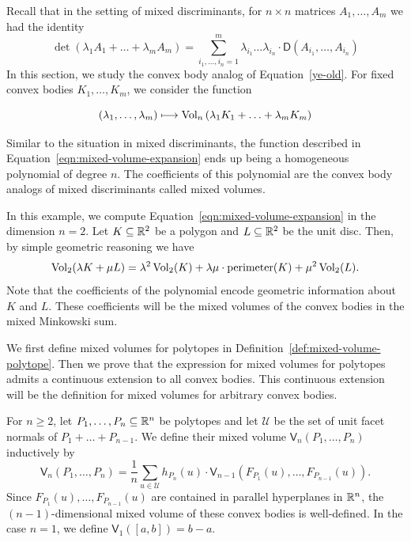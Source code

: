 \documentclass{puthesis-UG}
\begin{document}
Recall that in the setting of mixed discriminants, for $n \times n$ matrices $A_1, \ldots, A_m$ we had the identity
\begin{equation} \label{ye-old}
	\det (\lambda_1 A_1 + \ldots + \lambda_m A_m) = \sum_{i_1, \ldots, i_n = 1}^m \lambda_{i_1} \ldots \lambda_{i_n} \cdot \mathsf{D}(A_{i_1}, \ldots, A_{i_n})
\end{equation}
In this section, we study the convex body analog of Equation~\ref{ye-old}. For fixed convex bodies $K_1, \ldots, K_m$, we consider the function

\begin{equation} \label{eqn:mixed-volume-expansion}
	(\lambda_1, \ldots, \lambda_m) \longmapsto \operatorname{Vol}_n \left (\lambda_1 K_1 + \ldots + \lambda_m K_m \right )
\end{equation}

Similar to the situation in mixed discriminants, the function described in Equation~\ref{eqn:mixed-volume-expansion} ends up being a homogeneous polynomial of degree $n$. The coefficients of this polynomial are the convex body analogs of mixed discriminants called mixed volumes. 

\begin{example} \label{example:small-case}
	In this example, we compute Equation~\ref{eqn:mixed-volume-expansion} in the dimension $n = 2$. Let $K \subseteq \mathbb{R}^2$ be a polygon and $L \subseteq \mathbb{R}^2$ be the unit disc. Then, by simple geometric reasoning we have 
	\[
		\operatorname{Vol}_2 (\lambda K + \mu L) = \lambda^2 \operatorname{Vol}_2(K) + \lambda \mu \cdot \text{perimeter}(K) + \mu^2 \operatorname{Vol}_2(L). 
	\]
	Note that the coefficients of the polynomial encode geometric information about $K$ and $L$. These coefficients will be the mixed volumes of the convex bodies in the mixed Minkowski sum. 
\end{example}

We first define mixed volumes for polytopes in Definition~\ref{def:mixed-volume-polytope}. Then we prove that the expression for mixed volumes for polytopes admits a continuous extension to all convex bodies. This continuous extension will be the definition for mixed volumes for arbitrary convex bodies.

\begin{defn} \label{def:mixed-volume-polytope}
	For $n \geq 2$, let $P_1, \ldots, P_n \subseteq \mathbb{R}^n$ be polytopes and let $\mathcal{U}$ be the set of unit facet normals of $P_1 + \ldots + P_{n-1}$. We define their mixed volume $\mathsf{V}_n(P_1, \ldots, P_n)$ inductively by 
	\[
		\mathsf{V}_n(P_1, \ldots, P_n) = \frac{1}{n} \sum_{u \in \mathcal{U}} h_{P_n}(u) \cdot \mathsf{V}_{n-1} (F_{P_1}(u), \ldots, F_{P_{n-1}}(u)).
	\]
	Since $F_{P_1}(u), \ldots, F_{P_{n-1}}(u)$ are contained in parallel hyperplanes in $\mathbb{R}^n$, the $(n-1)$-dimensional mixed volume of these convex bodies is well-defined. In the case $n = 1$, we define $\mathsf{V}_1 ([a, b]) = b-a$. 
\end{defn}
\end{document}

